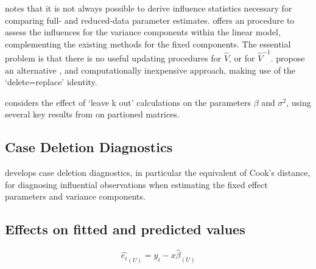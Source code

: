 \documentclass[12pt, a4paper]{report}
\theoremstyle{plain}
\theoremstyle{definition}
\theoremstyle{remark}
\begin{document}
	
	
	
	
	
	\citet{schabenberger} notes that it is not always possible to
	derive influence statistics necessary for comparing full- and
	reduced-data parameter estimates. \citet{HaslettDillane} offers an
	procedure to assess the influences for the variance components
	within the linear model, complementing the existing methods for
	the fixed components. The essential problem is that there is no
	useful updating procedures for $\hat{V}$, or for $\hat{V}^{-1}$.
	\citet{HaslettDillane} propose an alternative , and
	computationally inexpensive approach, making use of the
	`delete=replace' identity.
	
	\citet{Haslett99} considers the effect of `leave k out'
	calculations on the parameters $\beta$ and $\sigma^{2}$, using
	several key results from \citet{HaslettHayes} on partioned
	matrices.
	
	
	
	
	
	
	
	\subsection{Case Deletion Diagnostics} %
	
	
	\citet{CPJ} develops  case deletion diagnostics, in particular the equivalent of  Cook's distance, for diagnosing influential observations when estimating the fixed effect parameters and variance components.
	
	\subsection{Effects on fitted and predicted values}
	\begin{equation}
	\hat{e_{i}}_{(U)} = y_{i} - x\hat{\beta}_{(U)}
	\end{equation}
	
\end{document}
